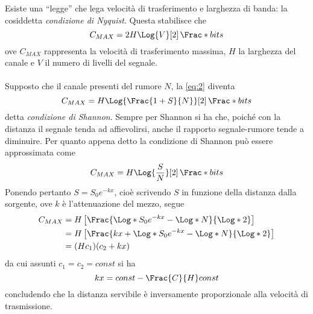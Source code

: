 \documentclass{subfiles}
\begin{document}
Esiste una ``legge'' che lega velocità di trasferimento e larghezza di banda: la cosiddetta \emph{condizione di Nyquist}.
Questa stabilisce che
\begin{equation}
    C_{MAX} = 2H \Log{V}[2] \, \Frac*{bit}{s}
\end{equation}
ove \(C_{MAX}\) rappresenta la velocità di trasferimento massima, \(H\) la larghezza del canale e \(V\) il numero di livelli del segnale. \\ \\
Supposto che il canale presenti del rumore \(N\), la \eqref{eq:2} diventa
\[
    C_{MAX} = H \Log{\Frac{1 + S}{N}}[2] \, \Frac*{bit}{s}
\]
detta \emph{condizione di Shannon}. Sempre per Shannon si ha che, poiché con la distanza il segnale tenda ad affievolirsi,
anche il rapporto segnale-rumore tende a diminuire.
Per quanto appena detto la condizione di Shannon può essere approssimata come
\[
    C_{MAX} = H \Log{\frac{S}{N}}[2] \, \Frac*{bit}{s}
\]
Ponendo pertanto \(S = S_{0}e^{-kx}\), cioè scrivendo \(S\) in funzione della distanza dalla sorgente, ove \(k\) è l'attenuazione del mezzo, segue
\[\begin{aligned}
        C_{MAX} & = H \left[\Frac{\Log*{S_{0}e^{-kx}} - \Log*{N}}{\Log*{2}}\right]       \\
                & = H \left[\Frac{kx  + \Log*{S_{0}e^{-kx}} - \Log*{N}}{\Log*{2}}\right] \\
                & = (Hc_{1})(c_{2} + kx)
    \end{aligned}\]
da cui assunti \(c_{1} = c_{2} = const\) si ha
\[
    kx = const - \Frac{C}{H} const
\]
concludendo che la distanza servibile è inversamente proporzionale alla velocità di trasmissione.
\end{document}
